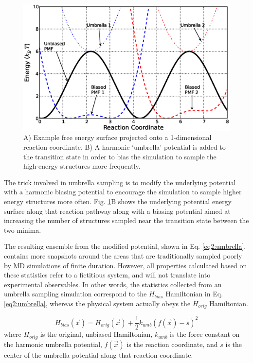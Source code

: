 \begin{figure}
   \includegraphics[width=6.5in]{FreeEnergyProfile.ps}
   \caption{A) Example free energy surface projected onto a 1-dimensional reaction
            coordinate. B) A harmonic `umbrella' potential is added to the
            transition state in order to bias the simulation to sample the
            high-energy structures more frequently.}
   \label{fig2:FreeEnergyProfile}
\end{figure}

The trick involved in umbrella sampling is to modify the underlying potential
with a harmonic biasing potential to encourage the simulation to sample higher
energy structures more often. Fig. \ref{fig2:FreeEnergyProfile}B shows the
underlying potential energy surface along that reaction pathway along with a
biasing potential aimed at increasing the number of structures sampled near the
transition state between the two minima.

The resulting ensemble from the modified potential, shown in Eq.
\ref{eq2:umbrella}, contains more snapshots around the areas that are
traditionally sampled poorly by MD simulations of finite duration. However, all
properties calculated based on these statistics refer to a fictitious system,
and will not translate into experimental observables. In other words, the
statistics collected from an umbrella sampling simulation correspond to the
$H_{bias}$ Hamiltonian in Eq. \ref{eq2:umbrella}, whereas the physical system
actually obeys the $H_{orig}$ Hamiltonian. \cite{Leach_Book_MolModel_2001}

\begin{equation}
   H_{bias}(\vec{x}) = H_{orig}(\vec{x}) + \frac 1 2 k_{umb}(f(\vec{x}) - s)^2
   \label{eq2:umbrella}
\end{equation}
where $H_{orig}$ is the original, unbiased Hamiltonian, $k_{umb}$ is the force
constant on the harmonic umbrella potential, $f(\vec{x})$ is the reaction
coordinate, and $s$ is the center of the umbrella potential along that reaction
coordinate.

